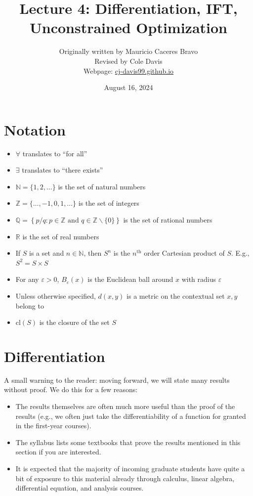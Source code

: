 \documentclass{article}
\title{Lecture 4: Differentiation, IFT, Unconstrained Optimization}
\author{Originally written by Mauricio Caceres Bravo\\Revised by Cole Davis\\Webpage: \href{https://cj-davis99.github.io/math-camp.html}{cj-davis99.github.io}}
\date{August 16, 2024}
\newcommand{\cl}{\text{cl}}
\newcommand{\R}{\mathbb{R}}
\newcommand{\N}{\mathbb{N}}
\newcommand{\Q}{\mathbb{Q}}
\newcommand{\Z}{\mathbb{Z}}
\theoremstyle{mythm}
\theoremstyle{mydef}
\begin{document}
\maketitle
\tableofcontents
\newpage
\section*{Notation}
\begin{itemize}
    \item $\forall$ translates to ``for all''
    \item $\exists$ translates to ``there exists''
    \item $\N = \{1,2, \hdots\}$ is the set of natural numbers
    \item $\Z = \{\hdots, -1, 0, 1, \hdots \}$ is the set of integers
    \item $\Q = \left\{ p/q : p \in \Z \text{ and } q \in \Z\backslash\{0\} \right\}$ is the set of rational numbers
    \item $\R$ is the set of real numbers
    \item If $S$ is a set and $n\in \N$, then $S^n$ is the $n^{\text{th}}$ order Cartesian product of $S$. E.g., $S^2 = S \times S$ 
    \item For any $\varepsilon>0$, $B_\varepsilon(x)$ is the Euclidean ball around $x$ with radius $\varepsilon$
    \item Unless otherwise specified, $d(x, y)$ is a metric on the contextual set $x,y$ belong to
    \item $\cl(S)$ is the closure of the set $S$
\end{itemize}
\newpage
\section{Differentiation}
\label{sub:differentiation}

A small warning to the reader: moving forward, we will state many results without proof. We do this for a few reasons:
\begin{itemize}
    \item[(a)] The results themselves are often much more useful than the proof of the results (e.g., we often just take the differentiability of a function for granted in the first-year courses).
    \item[(b)] The syllabus lists some textbooks that prove the results mentioned in this section if you are interested.
    \item[(c)] It is expected that the majority of incoming graduate students have quite a bit of exposure to this material already through calculus, linear algebra, differential equation, and analysis courses. 
\end{itemize}
\end{document}

